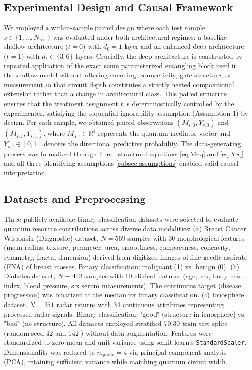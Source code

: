 \documentclass[
    reprint,
    amsmath, amssymb,
    aps,
    floatfix,
    nofootinbib
]{revtex4-1}
\begin{document}
\subsection*{Experimental Design and Causal Framework}
We employed a within-sample paired design where each test sample $s \in \{1, \ldots, N_{\text{test}}\}$ was evaluated under both architectural regimes: a baseline shallow architecture ($t=0$) with $d_0=1$ layer and an enhanced deep architecture ($t=1$) with $d_1 \in \{3, 6\}$ layers. Crucially, the deep architecture is constructed by repeated application of the exact same parameterized entangling block used in the shallow model without altering encoding, connectivity, gate structure, or measurement so that circuit depth constitutes a strictly nested compositional extension rather than a change in architectural class. This paired structure ensures that the treatment assignment $t$ is deterministically controlled by the experimenter, satisfying the sequential ignorability assumption (Assumption 1) by design. For each sample, we obtained paired observations $(M_{s,0}, Y_{s,0})$ and $(M_{s,1}, Y_{s,1})$, where $M_{s,t} \in \mathbb{R}^4$ represents the quantum mediator vector and $Y_{s,t} \in [0,1]$ denotes the directional predictive probability.
The data-generating process was formalized through linear structural equations \ref{eq:Meq} and \ref{eq:Yeq} and all three identifying assumptions \ref{subsec:assumptions} enabled valid causal interpretation.

\subsection*{Datasets and Preprocessing}

Three publicly available binary classification datasets were selected to evaluate quantum resource contributions across diverse data modalities:
(a) Breast Cancer Wisconsin (Diagnostic) dataset, $N=569$ samples with 30 morphological features (mean radius, texture, perimeter, area, smoothness, compactness, concavity, symmetry, fractal dimension) derived from digitized images of fine needle aspirate (FNA) of breast masses. Binary classification: malignant (1) vs. benign (0).
(b) Diabetes dataset, $N=442$ samples with 10 clinical features (age, sex, body mass index, blood pressure, six serum measurements). The continuous target (disease progression) was binarized at the median for binary classification.
(c) Ionosphere dataset, $N=351$ radar returns with 34 continuous attributes representing processed radar signals. Binary classification: "good" (structure in ionosphere) vs. "bad" (no structure). All datasets employed stratified 70-30 train-test splits (random seed 42 and 142 ) without data augmentation. Features were standardized to zero mean and unit variance using scikit-learn's \texttt{StandardScaler}. Dimensionality was reduced to $n_{\text{qubits}}=4$ via principal component analysis (PCA), retaining sufficient variance while matching quantum circuit width.
\end{document}
